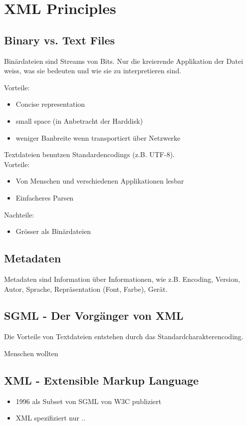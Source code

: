 \chapter{XML Principles}
\section{Binary vs. Text Files}
Binärdateien sind Streams von Bits. Nur die kreierende Applikation der Datei weiss, was sie bedeuten und wie sie zu interpretieren sind.

Vorteile:\\
\begin{itemize}
\item Concise representation
\item small space (in Anbetracht der Harddisk)
\item weniger Banbreite wenn transportiert über Netzwerke
\end{itemize}

Textdateien benutzen Standardencodings (z.B. UTF-8).\\

Vorteile:
\begin{itemize}
\item Von Menschen und verschiedenen Applikationen lesbar
\item Einfacheres Parsen
\end{itemize}
Nachteile:
\begin{itemize}
\item Grösser als Binärdateien
\end{itemize}

\section{Metadaten}
Metadaten sind Information über Informationen, wie z.B. Encoding, Version, Autor, Sprache, Repräsentation (Font, Farbe), Gerät.


\section{SGML - Der Vorgänger von XML}

Die Vorteile von Textdateien entstehen durch das Standardcharakterencoding.

Menschen wollten

\section{XML - Extensible Markup Language}
\begin{itemize}
\item 1996 als Subset von SGML von W3C publiziert
\item XML spezifiziert nur ..
\end{itemize}

